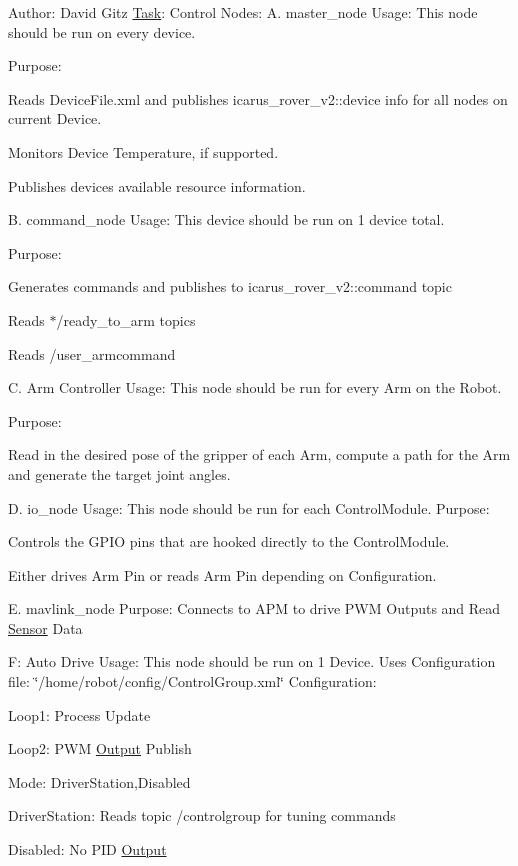 Author\+: David Gitz \hyperlink{structTask}{Task}\+: Control Nodes\+: A. master\+\_\+node Usage\+: This node should be run on every device.

Purpose\+:
\begin{DoxyEnumerate}
\item Reads Device\+File.\+xml and publishes icarus\+\_\+rover\+\_\+v2\+::device info for all nodes on current Device.
\item Monitors Device Temperature, if supported.
\item Publishes device\textquotesingle{}s available resource information.
\end{DoxyEnumerate}

B. command\+\_\+node Usage\+: This device should be run on 1 device total.

Purpose\+:
\begin{DoxyEnumerate}
\item Generates commands and publishes to icarus\+\_\+rover\+\_\+v2\+::command topic
\item Reads $\ast$/ready\+\_\+to\+\_\+arm topics
\item Reads /user\+\_\+armcommand
\end{DoxyEnumerate}

C. Arm Controller Usage\+: This node should be run for every Arm on the Robot.

Purpose\+:
\begin{DoxyEnumerate}
\item Read in the desired pose of the gripper of each Arm, compute a path for the Arm and generate the target joint angles.
\end{DoxyEnumerate}

D. io\+\_\+node Usage\+: This node should be run for each Control\+Module. Purpose\+:
\begin{DoxyEnumerate}
\item Controls the G\+P\+IO pins that are hooked directly to the Control\+Module.
\item Either drives Arm Pin or reads Arm Pin depending on Configuration.
\end{DoxyEnumerate}

E. mavlink\+\_\+node Purpose\+: Connects to A\+PM to drive P\+WM Outputs and Read \hyperlink{structSensor}{Sensor} Data

F\+: Auto Drive Usage\+: This node should be run on 1 Device. Uses Configuration file\+: \char`\"{}/home/robot/config/\+Control\+Group.\+xml\char`\"{} Configuration\+:
\begin{DoxyItemize}
\item Loop1\+: Process Update
\item Loop2\+: P\+WM \hyperlink{structOutput}{Output} Publish
\item Mode\+: Driver\+Station,Disabled
\begin{DoxyItemize}
\item Driver\+Station\+: Reads topic /controlgroup for tuning commands
\item Disabled\+: No P\+ID \hyperlink{structOutput}{Output}
\end{DoxyItemize}
\end{DoxyItemize}


